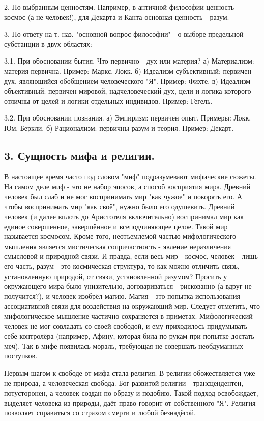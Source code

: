 \documentclass[a4paper, 12pt]{article}
\begin{document}
2. По выбранным ценностям.
Например, в античной философии ценность - космос (а не человек!), для Декарта и Канта основная ценность - разум.

3. По ответу на т. наз. "основной вопрос философии" - о выборе предельной субстанции в двух областях:

3.1. При обосновании бытия.
Что первично -  дух или материя?
а) Материализм: материя первична.
Пример: Маркс, Локк.
б) Идеализм субъективный: первичен дух, являющийся обобщением человеческого "Я".
Пример: Фихте.
в) Идеализм объективный: первичен мировой, надчеловеческий дух, цели и логика которого отличны от целей и логики отдельных индивидов.
Пример: Гегель.

3.2. При обосновании познания.
а) Эмпиризм: первичен опыт.
Примеры: Локк, Юм, Беркли.
б) Рационализм: первичны разум и теория.
Пример: Декарт.

\subsection*{\textbf{3. Сущность мифа и религии.}}

В настоящее время часто под словом "миф" подразумевают мифические сюжеты.
На самом деле миф - это не набор эпосов, а способ восприятия мира.
Древний человек был слаб и не мог воспринимать мир "как чужое" и покорять его.
А чтобы воспринимать мир "как своё", нужно было его одушевить.
Древний человек (и далее вплоть до Аристотеля включительно) воспринимал мир как единое совершенное, завершённое и всеподчиняющее целое.
Такой мир называется космосом.
Кроме того, неотъемлемой частью мифологического мышления является мистическая сопричастность - явление неразличения смысловой и природной связи.
И правда, если весь мир - космос, человек - лишь его часть, разум - это космическая структура, то как можно отличить связь, установленную природой, от связи, установленной разумом?
Просить у окружающего мира было унизительно, договариваться - рискованно (а вдруг не получится?), и человек изобрёл магию.
Магия - это попытка использования ассоциативной связи для воздействия на окружающий мир.
Следует отметить, что мифологическое мышление частично сохраняется в приметах.
Мифологический человек не мог совладать со своей свободой, и ему приходилось придумывать себе контролёра (например, Афину, которая била по рукам при попытке достать меч).
Так в мифе появилась мораль, требующая не совершать необдуманных поступков.

Первым шагом к свободе от мифа стала религия.
В религии обожествляется уже не природа, а человеческая свобода.
Бог развитой религии - трансцендентен, потусторонен, а человек создан по образу и подобию.
Такой подход освобождает, выделяет человека из природы, даёт право говорит от собственного "Я".
Религия позволяет справиться со страхом смерти и любой безнадёгой.
\end{document}

